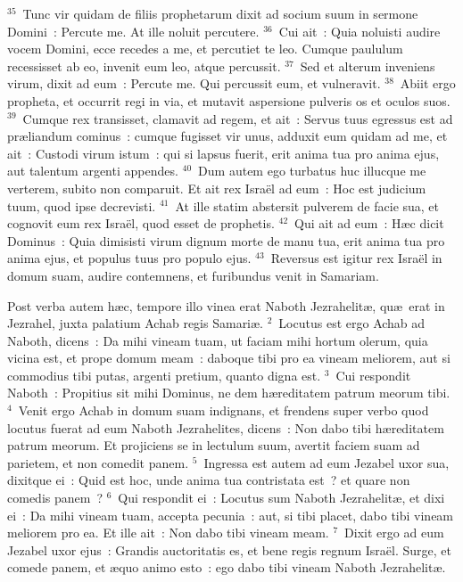 ${}^{35}$~Tunc vir quidam de filiis prophetarum dixit ad socium suum in sermone Domini~: Percute me. At ille noluit percutere.
${}^{36}$~Cui ait~: Quia noluisti audire vocem Domini, ecce recedes a me, et percutiet te leo. Cumque paululum recessisset ab eo, invenit eum leo, atque percussit.
${}^{37}$~Sed et alterum inveniens virum, dixit ad eum~: Percute me. Qui percussit eum, et vulneravit.
${}^{38}$~Abiit ergo propheta, et occurrit regi in via, et mutavit aspersione pulveris os et oculos suos.
${}^{39}$~Cumque rex transisset, clamavit ad regem, et ait~: Servus tuus egressus est ad pr\ae liandum cominus~: cumque fugisset vir unus, adduxit eum quidam ad me, et ait~: Custodi virum istum~: qui si lapsus fuerit, erit anima tua pro anima ejus, aut talentum argenti appendes.
${}^{40}$~Dum autem ego turbatus huc illucque me verterem, subito non comparuit. Et ait rex Isra\"el ad eum~: Hoc est judicium tuum, quod ipse decrevisti.
${}^{41}$~At ille statim abstersit pulverem de facie sua, et cognovit eum rex Isra\"el, quod esset de prophetis.
${}^{42}$~Qui ait ad eum~: H\ae c dicit Dominus~: Quia dimisisti virum dignum morte de manu tua, erit anima tua pro anima ejus, et populus tuus pro populo ejus.
${}^{43}$~Reversus est igitur rex Isra\"el in domum suam, audire contemnens, et furibundus venit in Samariam.

\bchapter
\lettrine[lines=3,image=true,loversize=0.05,lraise=-0.03]{P}{}ost verba autem h\ae c, tempore illo vinea erat Naboth Jezrahelit\ae , qu\ae\ erat in Jezrahel, juxta palatium Achab regis Samari\ae .
${}^{2}$~Locutus est ergo Achab ad Naboth, dicens~: Da mihi vineam tuam, ut faciam mihi hortum olerum, quia vicina est, et prope domum meam~: daboque tibi pro ea vineam meliorem, aut si commodius tibi putas, argenti pretium, quanto digna est.
${}^{3}$~Cui respondit Naboth~: Propitius sit mihi Dominus, ne dem h\ae reditatem patrum meorum tibi.
${}^{4}$~Venit ergo Achab in domum suam indignans, et frendens super verbo quod locutus fuerat ad eum Naboth Jezrahelites, dicens~: Non dabo tibi h\ae reditatem patrum meorum. Et projiciens se in lectulum suum, avertit faciem suam ad parietem, et non comedit panem.
${}^{5}$~Ingressa est autem ad eum Jezabel uxor sua, dixitque ei~: Quid est hoc, unde anima tua contristata est~? et quare non comedis panem~?
${}^{6}$~Qui respondit ei~: Locutus sum Naboth Jezrahelit\ae , et dixi ei~: Da mihi vineam tuam, accepta pecunia~: aut, si tibi placet, dabo tibi vineam meliorem pro ea. Et ille ait~: Non dabo tibi vineam meam.
${}^{7}$~Dixit ergo ad eum Jezabel uxor ejus~: Grandis auctoritatis es, et bene regis regnum Isra\"el. Surge, et comede panem, et \ae quo animo esto~: ego dabo tibi vineam Naboth Jezrahelit\ae .


